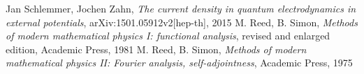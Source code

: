 \documentclass[11pt, oneside]{report}   	%
\title{}
\author{}
\begin{document}

%



\begin{thebibliography}{9}
 Jan Schlemmer, Jochen Zahn, \textit{The current density in quantum electrodynamics in external potentials}, arXiv:1501.05912v2[hep-th], 2015
 M. Reed, B. Simon, \textit{Methods of modern mathematical physics I: functional analysis}, revised and enlarged edition, Academic Press, 1981
 M. Reed, B. Simon, \textit{Methods of modern mathematical physics II: Fourier analysis, self-adjointness}, Academic Press, 1975
\end{thebibliography}
\end{document}
